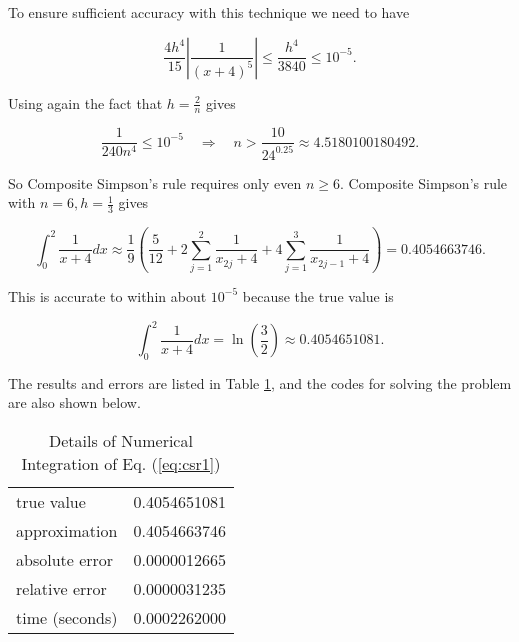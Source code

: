 \documentclass[preprint,12pt]{elsarticle}
\begin{document}
To ensure sufficient accuracy with this technique we need to have 

\begin{equation}
    \frac{4h^{4}}{15}\left|\frac{1}{(x+4)^5}\right|\leq\frac{h^4}{3840}\leq10^{-5}.
\end{equation}

Using again the fact that $h=\frac{2}{n}$ gives 

\begin{equation}
    \frac{1}{240 n^4}\leq10^{-5} \quad \Rightarrow \quad n > \frac{10}{24^{0.25}} \approx4.5180100180492.
\end{equation}

So Composite Simpson’s rule requires only even $n\geq6$. Composite Simpson’s rule with $n=6, h=\frac{1}{3}$ gives

\begin{equation}
    \int^{2}_{0} \frac{1}{x+4} dx \approx \frac{1}{9}\left(\frac{5}{12}+2\sum_{j=1}^{2}{\frac{1}{x_{2j}+4}}+4\sum_{j=1}^{3}{\frac{1}{x_{2j-1}+4}}\right)= 0.4054663746.
\end{equation}

This is accurate to within about $10^{-5}$ because the true value is

\begin{equation}
    \int^{2}_{0} \frac{1}{x+4} dx = \ln(\frac{3}{2}) \approx 0.4054651081.
\end{equation}

The results and errors are listed in Table \ref{tab:csr1}, and the codes for solving the problem are also shown below.

\begin{table}[h]
\centering
\begin{tabular}{l|l}
\hline
true value & 0.4054651081 \\
approximation & 0.4054663746 \\
absolute error & 0.0000012665 \\
relative error & 0.0000031235 \\
time (seconds) & 0.0002262000
\end{tabular}
\caption{Details of Numerical Integration of Eq. (\ref{eq:csr1})}
\label{tab:csr1}
\end{table}
\end{document}
